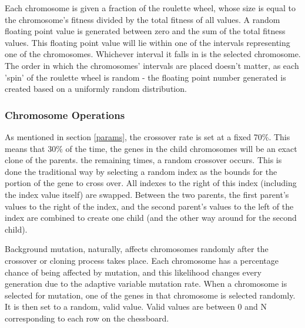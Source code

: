 \documentclass{sig-alternate}
\begin{document}
Each chromosome is given a fraction of the roulette wheel, whose size is equal to the chromosome's fitness divided by the total fitness of all values. A random floating point value is generated between zero and the sum of the total fitness values. This floating point value will lie within one of the intervals representing one of the chromosomes. Whichever interval it falls in is the selected chromosome. The order in which the chromosomes' intervals are placed doesn't matter, as each 'spin' of the roulette wheel is random - the floating point number generated is created based on a uniformly random distribution.

\subsubsection{Chromosome Operations}
As mentioned in section \ref{params}, the crossover rate is set at a fixed 70\%. This means that 30\% of the time, the genes in the child chromosomes will be an exact clone of the parents. the remaining times, a random crossover occurs. This is done the traditional way by selecting a random index as the bounds for the portion of the gene to cross over. All indexes to the right of this index (including the index value itself) are swapped. Between the two parents, the first parent's values to the right of the index, and the second parent's values to the left of the index are combined to create one child (and the other way around for the second child).

Background mutation, naturally, affects chromosomes randomly after the crossover or cloning process takes place. Each chromosome has a percentage chance of being affected by mutation, and this likelihood changes every generation due to the adaptive variable mutation rate. When a chromosome is selected for mutation, one of the genes in that chromosome is selected randomly. It is then set to a random, valid value. Valid values are between 0 and N corresponding to each row on the chessboard.

\end{document}
